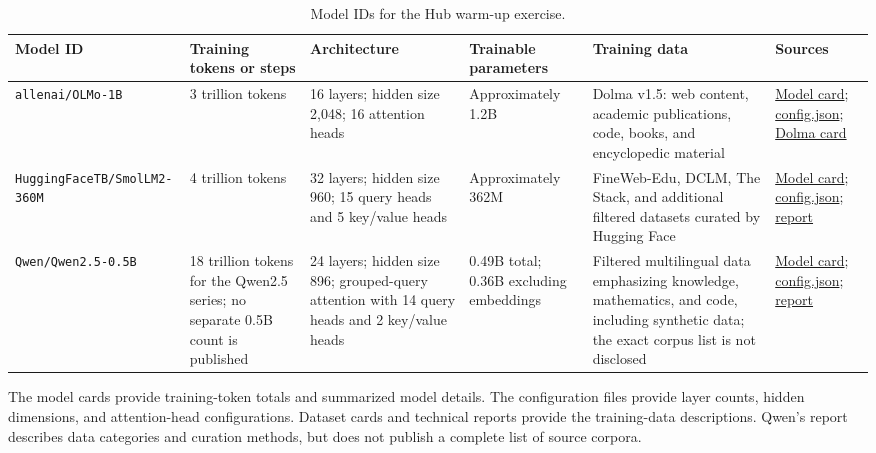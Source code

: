 \documentclass{article}
\begin{document}
\begin{table}[t]
\centering
\footnotesize
\caption{Model IDs for the Hub warm-up exercise.}
\label{tab:model-hub-warmup}
\begin{tabularx}{\textwidth}{@{}p{2.4cm}p{2.3cm}Yp{2.0cm}Yp{2.3cm}@{}}
\toprule
Model ID & Training tokens or steps & Architecture & Trainable parameters & Training data & Sources \\
\midrule
\texttt{allenai/OLMo-1B}
& 3 trillion tokens
& 16 layers; hidden size 2,048; 16 attention heads
& Approximately 1.2B
& Dolma v1.5: web content, academic publications, code, books, and encyclopedic material
& \href{https://huggingface.co/allenai/OLMo-1B}{Model card};
  \href{https://huggingface.co/allenai/OLMo-1B/blob/main/config.json}{config.json};
  \href{https://huggingface.co/datasets/allenai/dolma}{Dolma card} \\
\addlinespace
\texttt{HuggingFaceTB/\allowbreak SmolLM2-360M}
& 4 trillion tokens
& 32 layers; hidden size 960; 15 query heads and 5 key/value heads
& Approximately 362M
& FineWeb-Edu, DCLM, The Stack, and additional filtered datasets curated by Hugging Face
& \href{https://huggingface.co/HuggingFaceTB/SmolLM2-360M}{Model card};
  \href{https://huggingface.co/HuggingFaceTB/SmolLM2-360M/blob/main/config.json}{config.json};
  \href{https://arxiv.org/abs/2502.02737}{report} \\
\addlinespace
\texttt{Qwen/\allowbreak Qwen2.5-0.5B}
& 18 trillion tokens for the Qwen2.5 series; no separate 0.5B count is published
& 24 layers; hidden size 896; grouped-query attention with 14 query heads and 2 key/value heads
& 0.49B total; 0.36B excluding embeddings
& Filtered multilingual data emphasizing knowledge, mathematics, and code, including synthetic data; the exact corpus list is not disclosed
& \href{https://huggingface.co/Qwen/Qwen2.5-0.5B}{Model card};
  \href{https://huggingface.co/Qwen/Qwen2.5-0.5B/blob/main/config.json}{config.json};
  \href{https://arxiv.org/abs/2412.15115}{report} \\
\bottomrule
\end{tabularx}
\end{table}

The model cards provide training-token totals and summarized model details.
The configuration files provide layer counts, hidden dimensions, and
attention-head configurations. Dataset cards and technical reports provide
the training-data descriptions. Qwen's report describes data categories and
curation methods, but does not publish a complete list of source corpora.
\end{document}
